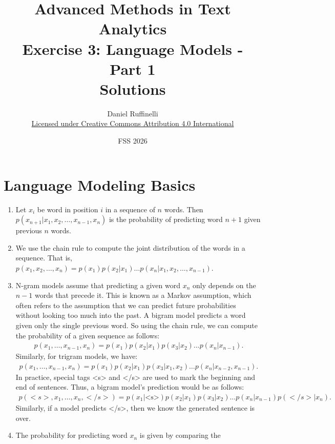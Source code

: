 \documentclass[11pt,a4paper]{article}
\title{Advanced Methods in Text Analytics \\ 
Exercise 3: Language Models - Part 1 \\
\textbf{Solutions}}
\author{Daniel Ruffinelli \\ \href{https://creativecommons.org/licenses/by/4.0/}{Licensed under Creative Commons Attribution 4.0 International}}
\date{FSS 2026}
\begin{document}
\maketitle

\section{Language Modeling Basics}

\begin{enumerate}[label=(\alph*)]
    \item Let $x_i$ be word in position $i$ in a sequence of $n$ words. Then
          $p(x_{n+1}|x_1, x_2, \ldots, x_{n-1}, x_{n})$ is the probability of
          predicting word $n+1$ given previous $n$ words.
    \item We use the chain rule to compute the joint distribution of the words
          in a sequence.
          That is,
          $p(x_1, x_2, \ldots, x_n) = p(x_1)p(x_2|x_1)\ldots p(x_n|x_1,x_2,\ldots,x_{n-1})$.
    \item N-gram models assume that predicting a given word $x_n$ only depends
          on the $n-1$ words that precede it.
          This is known as a Markov assumption, which often refers to the
          assumption that we can predict future probabilities without looking
          too much into the past.
          A bigram model predicts a word given only the single previous word.
          So using the chain rule, we can compute the probability of a given
          sequence as follows:
          \begin{align*}
              p(x_1,\ldots,x_{n-1},x_n) = p(x_1)p(x_2|x_1)p(x_3|x_2)\ldots p(x_n|x_{n-1}).
          \end{align*}
          Similarly, for trigram models, we have:
          \begin{align*}
              p(x_1,\ldots,x_{n-1},x_n) = p(x_1)p(x_2|x_1)p(x_3|x_1,x_2)\ldots p(x_n|x_{n-2},x_{n-1}).
          \end{align*}
          In practice, special tags <s> and </s> are used to mark the beginning
          and end of sentences.
          Thus, a bigram model's prediction would be as follows:
          \begin{align*}
              p(<s>,x_1,\ldots,x_n,</s>) = p(x_1|\text{<s>})p(x_2|x_1)p(x_3|x_2)\ldots p(x_n|x_{n-1})p(</s>|x_n).
          \end{align*}
          Similarly, if a model predicts </s>, then we know the generated
          sentence is over.
    \item The probability for predicting word $x_n$ is given by comparing the

\end{enumerate}
\end{document}
